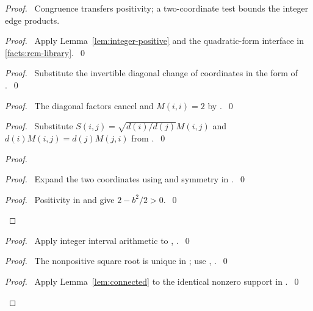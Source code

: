 \begin{proof}
\pfsketch\ Congruence transfers positivity; a two-coordinate test bounds
the integer edge products.
\begin{proof}\pf\ Apply Lemma~\ref{lem:integer-positive} and the
quadratic-form interface in \ref{facts:rem-library}.~\qed\end{proof}
\begin{proof}\pf\ Substitute the invertible diagonal change of coordinates
in the form of .~\qed\end{proof}
\begin{proof}\pf\ The diagonal factors cancel and $M(i,i)=2$ by
.~\qed\end{proof}
\begin{proof}\pf\ Substitute $S(i,j)=\sqrt{d(i)/d(j)}M(i,j)$ and
$d(i)M(i,j)=d(j)M(j,i)$ from .~\qed\end{proof}
\begin{proof}
\begin{proof}\pf\ Expand the two coordinates using 
and symmetry in .~\qed\end{proof}
\qedstep
\begin{proof}\pf\ Positivity in  and 
give $2-b^2/2>0$.~\qed\end{proof}
\end{proof}
\begin{proof}\pf\ Apply integer interval arithmetic to
, .~\qed\end{proof}
\begin{proof}\pf\ The nonpositive square root is unique in
; use , .~\qed\end{proof}
\begin{proof}\pf\ Apply Lemma~\ref{lem:connected} to the identical
nonzero support in .~\qed\end{proof}

\end{proof}
